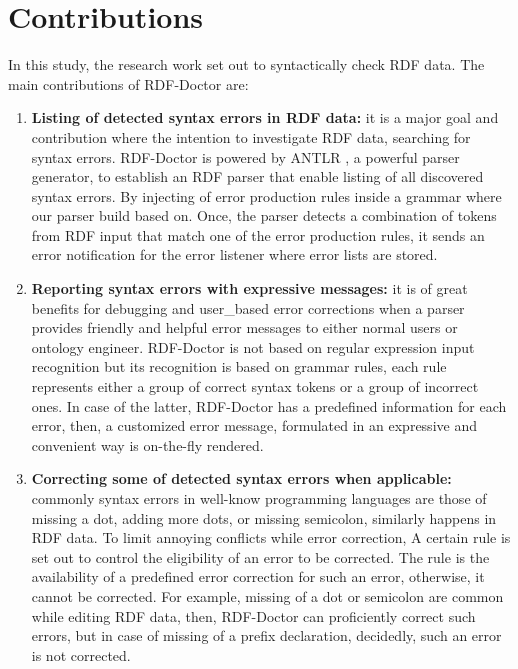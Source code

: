 \section {Contributions}
In this study, the research work set out to syntactically check RDF data. 
The main contributions of RDF-Doctor are:
\begin{enumerate}
	\item  {\bf Listing of detected syntax errors in RDF data:} it is a major goal and contribution where the intention to investigate RDF data, searching for syntax errors. RDF-Doctor is powered by ANTLR \cite{ANTLR:Website:Online}, a powerful parser generator, to establish an RDF parser that enable listing of all discovered syntax errors. By injecting of error production rules inside a grammar where our parser build based on. Once, the parser detects a combination of tokens from RDF input that match one of the error production rules, it sends an error notification for the error listener where error lists are stored.
	\item {\bf Reporting syntax errors with expressive messages:} it is of great benefits for debugging and user\_based error corrections when a parser provides friendly and helpful error messages to either normal users or ontology engineer. RDF-Doctor is not based on regular expression input recognition but its recognition is based on grammar rules, each rule represents either a group of correct syntax tokens or a group of incorrect ones. In case of the latter, RDF-Doctor has a predefined information for each error, then,  a customized error message, formulated in an expressive and convenient way is on-the-fly rendered.  
	\item {\bf Correcting some of detected syntax errors when applicable:} commonly syntax errors in well-know programming languages are those of missing a dot, adding more dots, or missing semicolon, similarly happens in RDF data. To limit annoying conflicts while error correction, A certain rule is set out to control the eligibility of an error to be corrected. The rule is the availability of a predefined error correction for such an error, otherwise, it cannot be corrected. For example, missing of a dot or semicolon are common while editing RDF data, then, RDF-Doctor can proficiently correct such errors, but in case of missing of a prefix declaration, decidedly, such an error is not corrected.     
\end{enumerate}

